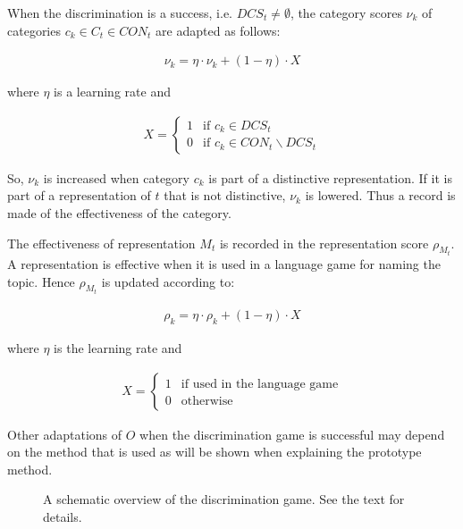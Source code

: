 When the discrimination is a success, i.e. $DCS_t \neq \emptyset$, the category scores $\nu_k$ of categories $c_k \in C_t \in CON_t$ are adapted as follows:

\begin{eqnarray}
\nu_k = \eta \cdot \nu_k + (1-\eta)\cdot X
\end{eqnarray}

\n
where $\eta$ is a learning rate and

\begin{eqnarray}
X = \left \{ \begin{array}{rl}
1 & \mbox{if } c_k \in DCS_t\\
0 & \mbox{if } c_k \in CON_t \backslash DCS_t
\end{array}\right. \nonumber
\end{eqnarray}

\n
So, $\nu_k$ is increased when category $c_k$ is part of a distinctive representation. If it is part of a representation of $t$ that is not distinctive, $\nu_k$ is lowered. Thus a record is made of the effectiveness of the category.

The effectiveness of representation $M_t$ is recorded in the representation score $\rho_{M_t}$. A representation is effective when it is used in a language game for naming the topic. Hence $\rho_{M_t}$ is updated according to:

\begin{eqnarray}
\rho_k = \eta \cdot \rho_k + (1-\eta)\cdot X
\end{eqnarray}

\n
where $\eta$ is the learning rate and

\begin{eqnarray}
X = \left \{ \begin{array}{rl}
1 & \mbox{if used in the language game}\\
0 & \mbox{otherwise}
\end{array}\right. \nonumber
\end{eqnarray}

Other adaptations of $O$ when the discrimination game is successful may depend on the method that is used as will be shown when explaining the prototype method.

\begin{figure}
\centerline{}
\caption{A schematic overview of the discrimination game. See the text for details.}
\label{f:cm:dg}
\end{figure}

